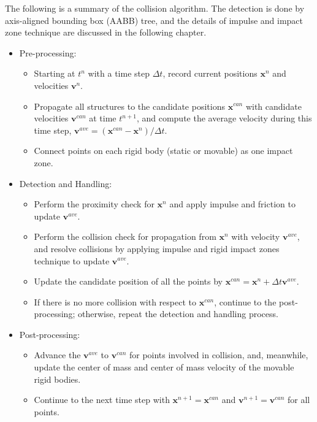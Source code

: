 The following is a summary of the collision algorithm. The detection is
done by axis-aligned bounding box (AABB) tree, and the details of impulse
and impact zone technique are discussed in the following chapter.
\begin{itemize}
\item Pre-processing:
    \begin{itemize}
    \item Starting at $t^n$ with a time step $\Delta t$, record
    current positions $\mathbf{x}^{n}$ and velocities $\mathbf{v}^{n}$.
    \item Propagate all structures to the candidate positions
    $\mathbf{x}^{can}$ with candidate velocities
    $\mathbf{v}^{can}$ at time $t^{n+1}$, and compute the average velocity
    during this time step,
    $\mathbf{v}^{ave} = (\mathbf{x}^{can} - \mathbf{x}^{n}) / \Delta t$.
    \item Connect points on each rigid body (static or movable) as one
    impact zone.
    \end{itemize}
\item Detection and Handling:
    \begin{itemize}
    \item Perform the proximity check for $\mathbf{x}^{n}$ and apply
    impulse and friction to update $\mathbf{v}^{ave}$.
    \item Perform the collision check for propagation from $\mathbf{x}^{n}$
    with velocity $\mathbf{v}^{ave}$, and resolve collisions by applying
    impulse and rigid impact zones technique to update $\mathbf{v}^{ave}$.
    \item Update the candidate position of all the points by
    $\mathbf{x}^{can} = \mathbf{x}^{n} + \Delta t \mathbf{v}^{ave}$.
    \item If there is no more collision with respect to $\mathbf{x}^{can}$,
    continue to the post-processing; otherwise, repeat the detection and
    handling process.
    \end{itemize}
\item Post-processing:
    \begin{itemize}
    \item Advance the $\mathbf{v}^{ave}$ to $\mathbf{v}^{can}$ for points
    involved in collision, and, meanwhile, update the center of mass and
    center of mass velocity of the movable rigid bodies.
    \item Continue to the next time step with
    $\mathbf{x}^{n+1} = \mathbf{x}^{can}$ and
    $\mathbf{v}^{n+1} = \mathbf{v}^{can}$ for all points.
    \end{itemize}
\end{itemize}



\newpage
